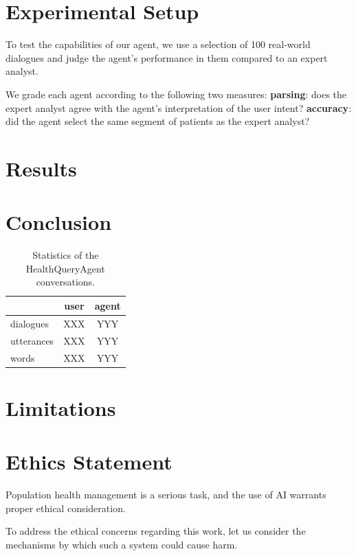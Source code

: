 \documentclass[11pt]{article}
\begin{document}
\section{Experimental Setup}
To test the capabilities of our agent, we use a selection of 100 real-world dialogues and judge the agent's performance in them compared to an expert analyst.

We grade each agent according to the following two measures: \textbf{parsing}: does the expert analyst agree with the agent's interpretation of the user intent? \textbf{accuracy}: did the agent select the same segment of patients as the expert analyst?

\section{Results}


\section{Conclusion}


\begin{table}[t]
\centering
\begin{tabular}{|l|c|c|}
\hline
	& user & agent \\
\hline
	dialogues	& XXX & YYY \\
	utterances	& XXX & YYY \\
	words 		& XXX & YYY \\
\hline
\end{tabular}
\caption{Statistics of the HealthQueryAgent conversations.}
\label{tab:results}
\end{table}



\section*{Limitations}

\section{Ethics Statement}
Population health management is a serious task, and the use of AI warrants proper ethical consideration.

To address the ethical concerns regarding this work, let us consider the mechanisms by which such a system could cause harm.
\end{document}
